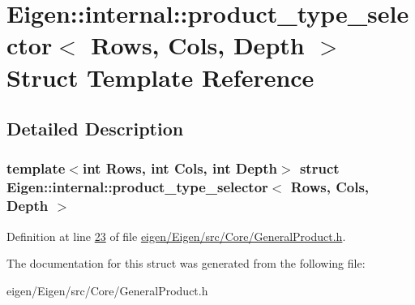 \hypertarget{struct_eigen_1_1internal_1_1product__type__selector}{}\section{Eigen\+:\+:internal\+:\+:product\+\_\+type\+\_\+selector$<$ Rows, Cols, Depth $>$ Struct Template Reference}
\label{struct_eigen_1_1internal_1_1product__type__selector}


\subsection{Detailed Description}
\subsubsection*{template$<$int Rows, int Cols, int Depth$>$\newline
struct Eigen\+::internal\+::product\+\_\+type\+\_\+selector$<$ Rows, Cols, Depth $>$}



Definition at line \hyperlink{eigen_2_eigen_2src_2_core_2_general_product_8h_source_l00023}{23} of file \hyperlink{eigen_2_eigen_2src_2_core_2_general_product_8h_source}{eigen/\+Eigen/src/\+Core/\+General\+Product.\+h}.



The documentation for this struct was generated from the following file\+:\begin{DoxyCompactItemize}
\item 
eigen/\+Eigen/src/\+Core/\+General\+Product.\+h\end{DoxyCompactItemize}
